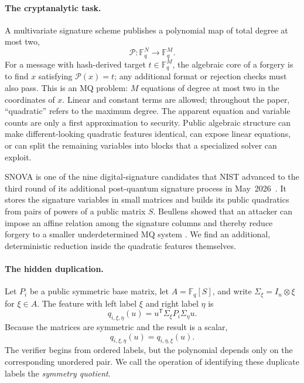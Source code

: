 \documentclass[11pt]{article}
\newcommand{\F}{\mathbb F}
\newcommand{\transpose}{\mathsf T}
\newcommand{\SNOVA}{\textsf{SNOVA}}
\begin{document}
\paragraph{The cryptanalytic task.}
A multivariate signature scheme publishes a polynomial map of total degree
at most two,
\[
  \mathcal P:\F_q^{N}\longrightarrow\F_q^{M}.
\]
For a message with hash-derived target $t\in\F_q^M$, the algebraic core of a
forgery is to find $x$ satisfying $\mathcal P(x)=t$; any additional format or
rejection checks must also pass.  This is an MQ problem: $M$ equations of
degree at most two in the coordinates of $x$.  Linear and constant terms are
allowed; throughout the paper, ``quadratic'' refers to the maximum degree.
The apparent equation and variable counts are only a first approximation to
security.  Public algebraic structure can make different-looking quadratic
features identical, can expose linear equations, or can split the remaining
variables into blocks that a specialized solver can exploit.

\SNOVA{} is one of the nine digital-signature candidates that NIST advanced to
the third round of its additional post-quantum signature process in
May~2026~\cite{NISTThirdRound2026}.  It stores the signature variables in small
matrices and builds its public quadratics from pairs of powers of a public
matrix $S$.  Beullens showed
that an attacker can impose an affine relation among the signature columns and
thereby reduce forgery to a smaller underdetermined MQ system
\cite{Beullens2024SNOVA}.  We find an additional, deterministic reduction
inside the quadratic features themselves.

\paragraph{The hidden duplication.}
Let $P_i$ be a public symmetric base matrix, let
$A=\F_q[S]$, and write $\Sigma_\xi=I_n\otimes\xi$ for $\xi\in A$.  The feature
with left label $\xi$ and right label $\eta$ is
\[
  q_{i,\xi,\eta}(u)
  =u^\transpose\Sigma_\xi P_i\Sigma_\eta u.
\]
Because the matrices are symmetric and the result is a scalar,
\begin{equation}\label{eq:intro-swap}
  q_{i,\xi,\eta}(u)=q_{i,\eta,\xi}(u).
\end{equation}
The verifier begins from ordered labels, but the polynomial depends only on
the corresponding unordered pair.  We call the operation of identifying
these duplicate labels the \emph{symmetry quotient}.
\end{document}
